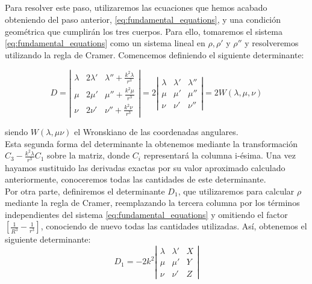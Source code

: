 \documentclass[11pt]{article}
\begin{document}
\subsection{}
\label{subsec:distancias}
Para resolver este paso, utilizaremos las ecuaciones que hemos acabado obteniendo del paso anterior, \eqref{eq:fundamental_equations}, y una condición geométrica que cumplirán los tres cuerpos. Para ello, tomaremos el sistema \eqref{eq:fundamental_equations} como un sistema lineal en $\rho, \rho'$ y $\rho''$ y resolveremos utilizando la regla de Cramer. Comencemos definiendo el siguiente determinante:

\[
D =
\left|
\begin{array}{ccc}
	\lambda & 2\lambda' & \lambda''+\frac{k^2\lambda}{r^3}\\
	\mu & 2\mu' & \mu''+\frac{k^2\mu}{r^3}\\
	\nu & 2\nu' & \nu''+\frac{k^2\nu}{r^3}
\end{array}
\right|
=
2
\left|
\begin{array}{ccc}
	\lambda & \lambda' & \lambda''\\
	\mu & \mu' & \mu''\\
	\nu & \nu' & \nu''
\end{array}
\right|
=2W(\lambda,\mu,\nu)
\]

\noindent siendo $W(\lambda,\mu\nu)$ el Wronskiano de las coordenadas angulares.\\

Esta segunda forma del determinante la obtenemos mediante la transformación $C_3-\frac{k^2\lambda}{r^3}C_1$ sobre la matriz, donde $C_i$ representará la columna i-ésima. Una vez hayamos sustituido las derivadas exactas por su valor aproximado calculado anteriormente, conoceremos todas las cantidades de este determinante.\\

Por otra parte, definiremos el determinante $D_1$, que utilizaremos para calcular $\rho$ mediante la regla de Cramer, reemplazando la tercera columna por los términos independientes del sistema \eqref{eq:fundamental_equations} y omitiendo el factor $[\frac{1}{R^3}-\frac{1}{r^3}]$, conociendo de nuevo todas las cantidades utilizadas. Así, obtenemos el siguiente determinante:
\[
D_1 = -2k^2
\left|
\begin{array}{ccc}
\lambda & \lambda' & X\\
\mu & \mu' & Y\\
\nu & \nu' & Z
\end{array}
\right|
\]
\end{document}
